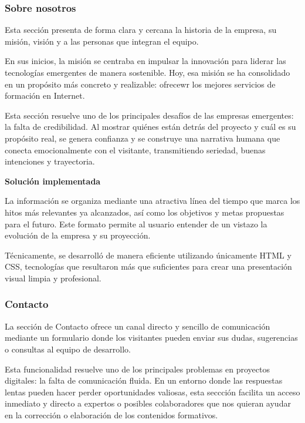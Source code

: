 \documentclass[11.5pt]{article}
\begin{document}
	\subsubsection{Sobre nosotros}
	
	Esta sección presenta de forma clara y cercana la historia de la empresa, su misión, visión y a las personas que integran el equipo.
	
	En sus inicios, la misión se centraba en impulsar la innovación para liderar las tecnologías emergentes de manera sostenible. Hoy, esa misión se ha consolidado en un propósito más concreto y realizable: ofrecewr los mejores servicios de formación en Internet.
	
	Esta sección resuelve uno de los principales desafíos de las empresas emergentes: la falta de credibilidad. Al mostrar quiénes están detrás del proyecto y cuál es su propósito real, se genera confianza y se construye una narrativa humana que conecta emocionalmente con el visitante, transmitiendo seriedad, buenas intenciones y trayectoria.
	
	\noindent\textbf{{\large Solución implementada}}
	
	La información se organiza mediante una atractiva línea del tiempo que marca los hitos más relevantes ya alcanzados, así como los objetivos y metas propuestas para el futuro. Este formato permite al usuario entender de un vistazo la evolución de la empresa y su proyección.
	
	Técnicamente, se desarrolló de manera eficiente utilizando únicamente HTML y CSS, tecnologías que resultaron más que suficientes para crear una presentación visual limpia y profesional.
	
	\subsubsection{Contacto}

	La sección de Contacto ofrece un canal directo y sencillo de comunicación mediante un formulario donde los visitantes pueden enviar sus dudas, sugerencias o consultas al equipo de desarrollo.
	
	Esta funcionalidad resuelve uno de los principales problemas en proyectos digitales: la falta de comunicación fluida. En un entorno donde las respuestas lentas pueden hacer perder oportunidades valiosas, esta seccción facilita un acceso inmediato y directo a expertos o posibles colaboradores que nos quieran ayudar en la corrección o elaboración de los contenidos formativos.
	
\end{document}
